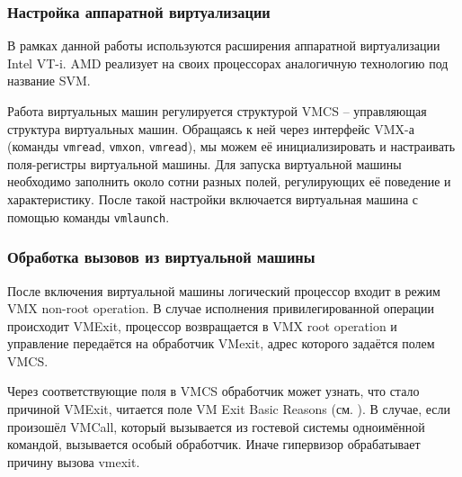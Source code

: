 \documentclass[a4paper,11pt]{extarticle}
\begin{document}
	\subsubsection{Настройка аппаратной виртуализации}
	В рамках данной работы используются расширения аппаратной виртуализации Intel VT-i. AMD реализует на своих процессорах аналогичную технологию под название SVM.\par
	Работа виртуальных машин регулируется структурой VMCS – управляющая структура виртуальных машин. Обращаясь к ней через интерфейс VMX-а (команды \texttt{vmread}, \texttt{vmxon}, \texttt{vmread}), мы можем её инициализировать и настраивать поля-регистры виртуальной машины. Для запуска виртуальной машины необходимо заполнить около сотни разных полей, регулирующих её поведение и характеристику. После такой настройки включается виртуальная машина с помощью команды \texttt{vmlaunch}.
	\subsubsection{Обработка вызовов из виртуальной машины}
	После включения виртуальной машины логический процессор входит в режим VMX non-root operation. В случае исполнения привилегированной операции происходит VMExit, процессор возвращается в VMX root operation и управление передаётся на обработчик VMexit, адрес которого задаётся полем VMCS.\par
	Через соответствующие поля в VMCS обработчик может узнать, что стало причиной VMExit, читается поле VM Exit Basic Reasons (см. \cite[том 3D]{intel}). В случае, если произошёл VMCall, который вызывается из гостевой системы одноимённой командой, вызывается особый обработчик. Иначе гипервизор обрабатывает причину вызова vmexit.
\end{document}
